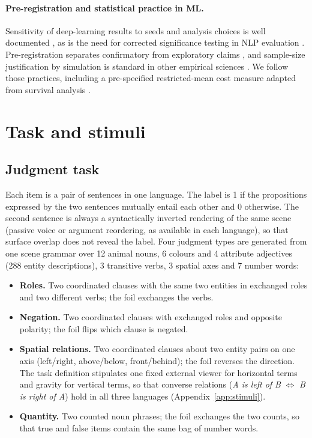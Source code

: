 \documentclass[preprint,12pt,authoryear]{elsarticle}
\begin{document}
\paragraph{Pre-registration and statistical practice in ML.} Sensitivity of deep-learning results to seeds and analysis choices is well documented \citep{henderson2018,bouthillier2019,agarwal2021}, as is the need for corrected significance testing in NLP evaluation \citep{dror2018}. Pre-registration separates confirmatory from exploratory claims \citep{nosek2018}, and sample-size justification by simulation is standard in other empirical sciences \citep{lakens2022}. We follow those practices, including a pre-specified restricted-mean cost measure adapted from survival analysis \citep{royston2013}.

\section{Task and stimuli}
\label{sec:task}

\subsection{Judgment task}

Each item is a pair of sentences in one language. The label is 1 if the propositions expressed by the two sentences mutually entail each other and 0 otherwise. The second sentence is always a syntactically inverted rendering of the same scene (passive voice or argument reordering, as available in each language), so that surface overlap does not reveal the label. Four judgment types are generated from one scene grammar over 12 animal nouns, 6 colours and 4 attribute adjectives (288 entity descriptions), 3 transitive verbs, 3 spatial axes and 7 number words:

\begin{itemize}
\item \textbf{Roles.} Two coordinated clauses with the same two entities in exchanged roles and two different verbs; the foil exchanges the verbs.
\item \textbf{Negation.} Two coordinated clauses with exchanged roles and opposite polarity; the foil flips which clause is negated.
\item \textbf{Spatial relations.} Two coordinated clauses about two entity pairs on one axis (left/right, above/below, front/behind); the foil reverses the direction. The task definition stipulates one fixed external viewer for horizontal terms and gravity for vertical terms, so that converse relations (\emph{A is left of B} $\Leftrightarrow$ \emph{B is right of A}) hold in all three languages (Appendix~\ref{app:stimuli}).
\item \textbf{Quantity.} Two counted noun phrases; the foil exchanges the two counts, so that true and false items contain the same bag of number words.
\end{itemize}
\end{document}
